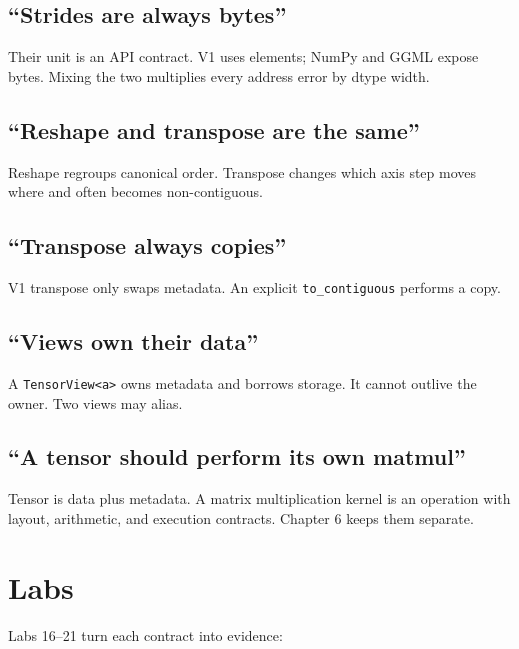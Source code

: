 \subsection{``Strides are always
bytes''}\label{strides-are-always-bytes}

Their unit is an API contract. V1 uses elements; NumPy and GGML expose
bytes. Mixing the two multiplies every address error by dtype width.

\subsection{``Reshape and transpose are the
same''}\label{reshape-and-transpose-are-the-same}

Reshape regroups canonical order. Transpose changes which axis step
moves where and often becomes non-contiguous.

\subsection{``Transpose always
copies''}\label{transpose-always-copies}

V1 transpose only swaps metadata. An explicit \texttt{to\_contiguous}
performs a copy.

\subsection{``Views own their data''}\label{views-own-their-data}

A \texttt{TensorView\textless{}\textquotesingle{}a\textgreater{}} owns
metadata and borrows storage. It cannot outlive the owner. Two views may
alias.

\subsection{``A tensor should perform its own
matmul''}\label{a-tensor-should-perform-its-own-matmul}

Tensor is data plus metadata. A matrix multiplication kernel is an
operation with layout, arithmetic, and execution contracts. Chapter 6
keeps them separate.

\section{Labs}\label{labs-1}

Labs 16--21 turn each contract into evidence:

